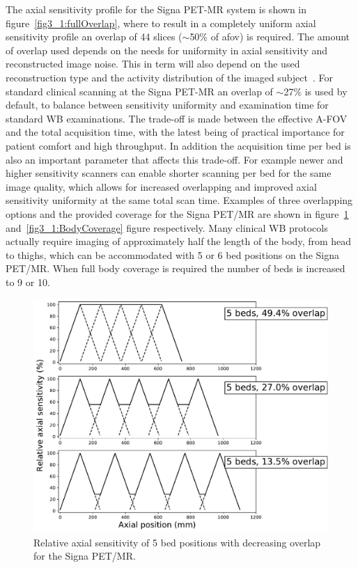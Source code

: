 %
The axial sensitivity profile for the Signa PET-MR system is shown in figure~\ref{fig3_1:fullOverlap}, where to result in a completely uniform axial sensitivity profile an overlap of 44 slices ($\sim$50\% of \gls{afov}) is required.
The amount of overlap used depends on the needs for uniformity in axial sensitivity and reconstructed image noise. This in term will also depend on the used reconstruction type and the activity distribution of the imaged subject~\cite{Schubert1996}. 
For standard clinical scanning at the Signa PET-MR an overlap of $\sim$27\% is used by default, to balance between sensitivity uniformity and examination time for standard WB examinations. The trade-off is made between the effective A-FOV and the total acquisition time, with the latest being of practical importance for patient comfort and high throughput. In addition the acquisition time per bed is also an important parameter that affects this trade-off. For example newer and higher sensitivity scanners can enable shorter scanning per bed for the same image quality, which allows for increased overlapping and improved axial sensitivity uniformity at the same total scan time.
Examples of three overlapping options and the provided coverage for the Signa PET/MR are shown in figure~\ref{fig3_1:decreasingOverlap} and~\ref{fig3_1:BodyCoverage} figure respectively.
Many clinical WB protocols actually require imaging of approximately half the length of the body, from head to thighs, which can be accommodated with 5 or 6 bed positions on the Signa PET/MR. When full body coverage is required the number of beds is increased to 9 or 10. %
%
\begin{figure} [ht!]
\centering
\includegraphics[scale=0.5,angle=0]{2_Theory_Methods/figures/SensitivityProfiles_3Options.pdf}
\caption{Relative axial sensitivity of 5 bed positions with decreasing overlap for the Signa PET/MR.} 
\label{fig3_1:decreasingOverlap}
\end{figure}
